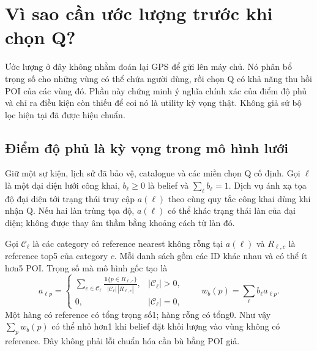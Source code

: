 \section{Vì sao cần ước lượng trước khi chọn Q?}
\label{sec:formal-belief-utility-bridge}

Ước lượng ở đây không nhằm đoán lại GPS để gửi lên máy chủ. Nó phân bổ
trọng số cho những vùng có thể chứa người dùng, rồi chọn Q có khả năng
thu hồi POI của các vùng đó. Phần này chứng minh ý nghĩa chính xác của
điểm độ phủ và chỉ ra điều kiện còn thiếu để coi nó là utility kỳ vọng
thật. Không giả sử bộ lọc hiện tại đã được hiệu chuẩn.

\subsection{Điểm độ phủ là kỳ vọng trong mô hình lưới}

Giữ một sự kiện, lịch sử đã bảo vệ, catalogue và các miền chọn Q cố định.
Gọi $\ell$ là một đại diện lưới công khai, $b_\ell\geq0$ là belief và
$\sum_\ell b_\ell=1$. Dịch vụ ánh xạ tọa độ đại diện tới trạng thái truy
cập $a(\ell)$ theo cùng quy tắc công khai dùng khi nhận Q. Nếu hai làn
trùng tọa độ, $a(\ell)$ có thể khác trạng thái làn của đại diện; không
được thay âm thầm bằng khoảng cách từ làn đó.

Gọi $\mathcal C_\ell$ là các category có reference nearest không rỗng
tại $a(\ell)$ và $R_{\ell,c}$ là reference top5 của category $c$.
Mỗi danh sách gồm các ID khác nhau và có thể ít hơn5 POI. Trọng số mà
mô hình gốc tạo là
\begin{equation}
 a_{\ell p}=\begin{cases}
 \displaystyle\sum_{c\in\mathcal C_\ell}
 \frac{\mathbf1\{p\in R_{\ell,c}\}}
 {|\mathcal C_\ell|\,|R_{\ell,c}|},&|\mathcal C_\ell|>0,\\[2mm]
 0,&|\mathcal C_\ell|=0,
 \end{cases}
 \qquad w_b(p)=\sum_\ell b_\ell a_{\ell p}.
 \label{eq:formal-belief-reference-weights}
\end{equation}
Một hàng có reference có tổng trọng số1; hàng rỗng có tổng0. Như vậy
$\sum_p w_b(p)$ có thể nhỏ hơn1 khi belief đặt khối lượng vào vùng
không có reference. Đây không phải lỗi chuẩn hóa cần bù bằng POI giả.

